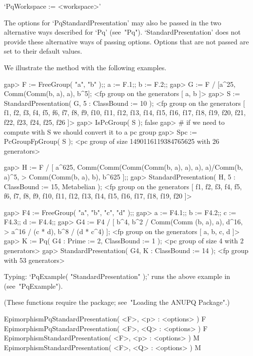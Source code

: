 \item{}`PqWorkspace := <workspace>'

\endlist

The options for `PqStandardPresentation' may also be passed  in  the  two
alternative ways described for  `Pq'  (see~"Pq").  `StandardPresentation'
does not provide these alternative ways of passing options. Options  that
are not passed are set to their default values.

We illustrate the method with the following examples.

\beginexample
gap> F := FreeGroup( "a", "b" );; a := F.1;; b := F.2;;
gap> G := F / [a^25, Comm(Comm(b, a), a), b^5];
<fp group on the generators [ a, b ]>
gap> S := StandardPresentation( G, 5 : ClassBound := 10 );
<fp group on the generators [ f1, f2, f3, f4, f5, f6, f7, f8, f9, f10, f11, 
  f12, f13, f14, f15, f16, f17, f18, f19, f20, f21, f22, f23, f24, f25, f26 ]>
gap> IsPcGroup( S );
false
gap> # if we need to compute with S we should convert it to a pc group
gap> Spc := PcGroupFpGroup( S );
<pc group of size 1490116119384765625 with 26 generators>

gap> H := F / [ a^625, Comm(Comm(Comm(Comm(b, a), a), a), a)/Comm(b, a)^5,
>               Comm(Comm(b, a), b), b^625 ];;                     
gap> StandardPresentation( H, 5 : ClassBound := 15, Metabelian );
<fp group on the generators [ f1, f2, f3, f4, f5, f6, f7, f8, f9, f10, f11, 
  f12, f13, f14, f15, f16, f17, f18, f19, f20 ]>

gap> F4 := FreeGroup( "a", "b", "c", "d" );;                        
gap> a := F4.1;; b := F4.2;; c := F4.3;; d := F4.4;;
gap> G4 := F4 / [ b^4, b^2 / Comm(Comm (b, a), a), d^16,                
>                 a^16 / (c * d), b^8 / (d * c^4) ];
<fp group on the generators [ a, b, c, d ]>
gap> K := Pq( G4 : Prime := 2, ClassBound := 1 );
<pc group of size 4 with 2 generators>
gap> StandardPresentation( G4, K : ClassBound := 14 );
<fp group with 53 generators>
\endexample

Typing: `PqExample( "StandardPresentation" );' runs the above example  in
{\GAP} (see~"PqExample").

(These functions require the {\ANUPQ}  package;  see~"Loading  the  ANUPQ
Package".)

\>EpimorphismPqStandardPresentation( <F>, <p> : <options> ) F
\>EpimorphismPqStandardPresentation( <F>, <Q> : <options> ) F
\>EpimorphismStandardPresentation( <F>, <p> : <options> ) M
\>EpimorphismStandardPresentation( <F>, <Q> : <options> ) M

